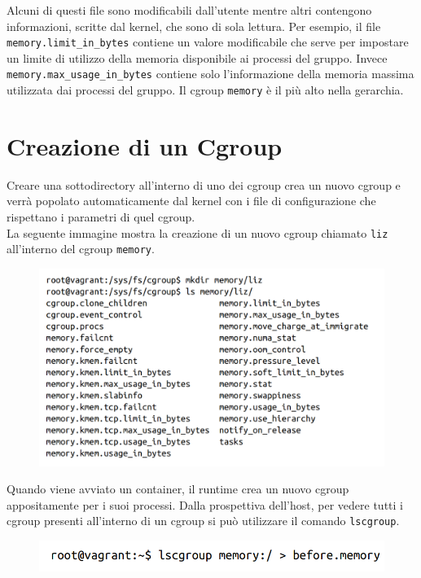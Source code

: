 Alcuni di questi file sono modificabili dall'utente mentre altri contengono
informazioni, scritte dal kernel, che sono di sola lettura. Per esempio,
il file \verb|memory.limit_in_bytes| contiene un valore modificabile che serve
per impostare un limite di utilizzo della memoria disponibile ai processi del gruppo.
Invece \verb|memory.max_usage_in_bytes| contiene solo l'informazione della memoria
massima utilizzata dai processi del gruppo.
Il cgroup \verb|memory| è il più alto nella gerarchia.

\section{Creazione di un Cgroup}

Creare una sottodirectory all'interno di uno dei cgroup crea un nuovo cgroup e
verrà popolato automaticamente dal kernel con i file di configurazione che rispettano
i parametri di quel cgroup.\\
La seguente immagine mostra la creazione di un nuovo cgroup chiamato \verb|liz|
all'interno del cgroup \verb|memory|.

\begin{figure}[H]
    \centering
    \includegraphics[width=\textwidth, keepaspectratio]{capitoli/os_security/imgs/cgroup3.png}
\end{figure}

Quando viene avviato un container, il runtime crea un nuovo cgroup appositamente
per i suoi processi. Dalla prospettiva dell'host, per vedere tutti i cgroup presenti
all'interno di un cgroup si può utilizzare il comando \verb|lscgroup|.

\begin{figure}[H]
    \centering
    \includegraphics[width=\textwidth, keepaspectratio]{capitoli/os_security/imgs/cgroup4.png}
\end{figure}

